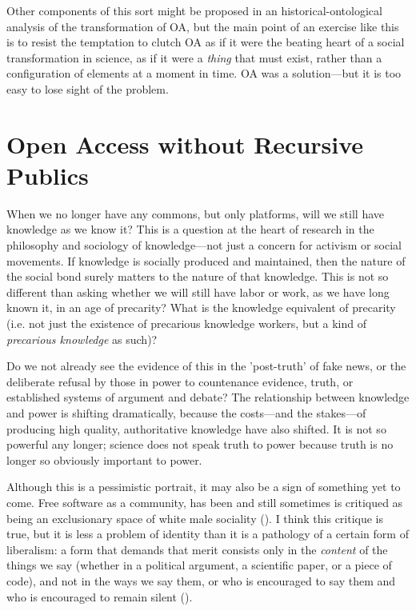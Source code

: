\documentclass[11pt]{report}
\begin{document}
Other components of this sort might be proposed in an historical-ontological analysis of the transformation of OA, but the main point of an exercise like this is to resist the temptation to clutch OA as if it were the beating heart of a social transformation in science, as if it were a  \emph{thing} that must exist, rather than a configuration of elements at a moment in time.  OA was a solution---but it is too easy to lose sight of the problem. 

\chapter*{Open Access without Recursive Publics}
\label{sec:org3264462}

When we no longer have any commons, but only platforms, will we still have knowledge as we know it?  This is a question at the heart of research in the philosophy and sociology of knowledge---not just a concern for activism or social movements.  If knowledge is socially produced and maintained, then the nature of the social bond surely matters to the nature of that knowledge.   This is not so different than asking whether we  will still have labor or work, as we have long known it, in an age of precarity?  What is the knowledge equivalent of precarity (i.e. not just the existence of precarious knowledge workers, but a kind of \emph{precarious knowledge} as such)?  

Do we not already see the evidence of this in the 'post-truth' of fake news, or the deliberate refusal by those in power to countenance evidence, truth, or established systems of argument and debate? The relationship between knowledge and power is shifting dramatically, because the costs---and the stakes---of producing high quality, authoritative knowledge have also shifted.  It is not so powerful any longer; science does not speak truth to power because truth is no longer so obviously important to power.

Although this is a pessimistic portrait, it may also be a sign of something yet to come.  Free software as a community, has been and still sometimes is critiqued as being an exclusionary space of white male sociality (\cite{nafus_patches_2012,massanari2016fapp,ford2017canedit,reagle2013freeassexis}).  I think this critique is true, but it is less a problem of identity than it is a pathology of a certain form of liberalism: a form that demands that merit consists only in the \emph{content} of the things we say (whether in a political argument, a scientific paper, or a piece of code), and not in the ways we say them, or who is encouraged to say them and who is encouraged to remain silent (\cite{dunbar-hester_low_2014}).
\end{document}
